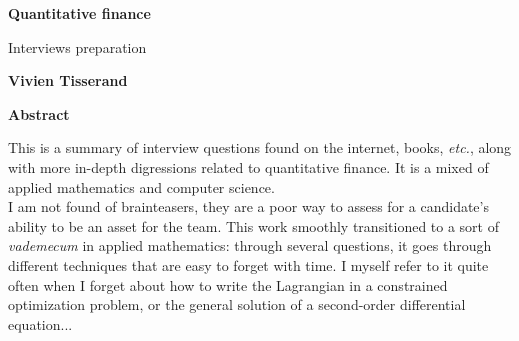 \begin{titlepage}
   \begin{center}
       \vspace*{1cm}

        \Large
       \textbf{Quantitative finance}

        \large
       \vspace{0.5cm}
        Interviews preparation
            
       \vspace{1.5cm}

       \textbf{Vivien Tisserand}

       \vfill
            
       \vspace{0.8cm}
     

    \textbf{Abstract}
    \end{center}
    
    This is a summary of interview questions found on the internet, books, \textit{etc.}, along with more in-depth digressions related to quantitative finance. It is a mixed of applied mathematics and computer science.\\
    I am not found of brainteasers, they are a poor way to assess for a candidate's ability to be an asset for the team. This work smoothly transitioned to a sort of \textit{vademecum} in applied mathematics: through several questions, it goes through different techniques that are easy to forget with time. I myself refer to it quite often when I forget about how to write the Lagrangian in a constrained optimization problem, or the general solution of a second-order differential equation...
    
\end{titlepage}
